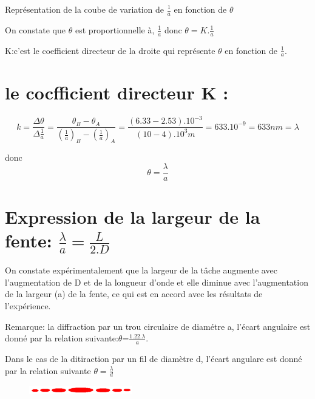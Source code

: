 \documentclass[12pt]{article}
\begin{document}
Représentation de la coube de variation de $\frac{1}{a}$ en fonction de $\theta$

On constate que $\theta$ est proportionnelle à, $\frac{1}{a}$ donc $\theta=K.\frac{1}{a}$

K:c'est le coefficient directeur de la droite qui représente $\theta$ en fonction de $\frac{1}{a}$.

\section*{le cocfficient directeur K : }
$$k = \frac{\Delta{\theta}}{\Delta{\frac{1}{a}}} = \frac{\theta_B - \theta_A}{(\frac{1}{a})_B -  (\frac{1}{a})_A} = \frac{(6.33 - 2.53).10^{-3}}{(10 - 4).10^3 m} = 633.10^{-9} = 633nm = \lambda$$

donc $$\theta = \frac{\lambda}{a}$$

\section*{Expression de la largeur de la fente: $\frac{\lambda}{a} = \frac{L}{2.D}$}
On constate expérimentalement que la largeur de la tâche augmente avec l'augmentation de D et de la longueur d'onde et elle diminue avec l'augmentation de la largeur (a) de la fente, ce qui est en accord avec les résultats de l'expérience.
\begin{tcolorbox}
Remarque:
	la diffraction par un trou circulaire de diamétre a, l'écart angulaire est donné par la relation suivante:$\theta$=$\frac{1.22.\lambda}{a}$.

	Dans le cas de la ditiraction par un fil de diamètre d, l'écart angulare est donné par la relation suivante $\theta = \frac{\lambda}{d}$
\end{tcolorbox}
	
\begin{figure}
	\vspace{-1cm}
	\includegraphics[width=0.4\textwidth]{./img/OLapplication01.png}
\end{figure}
\end{document}
